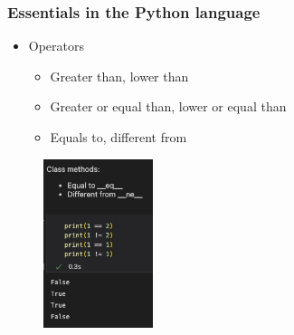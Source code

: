 \begin{frame}\frametitle{Essentials in the Python language}
   \begin{minipage}{0.48\linewidth}
      \begin{itemize}
         \item Operators
         \begin{itemize}
            \item Greater than, lower than
            \item Greater or equal than, lower or equal than
            \item Equals to, different from
         \end{itemize}
      \end{itemize}
   \end{minipage}
   \begin{minipage}{0.48\linewidth}
      \begin{figure}[H]
         \includegraphics[width=3.2cm]{../images/illustrations/eq_ne.jpg}
      \end{figure}
   \end{minipage}
\end{frame}


